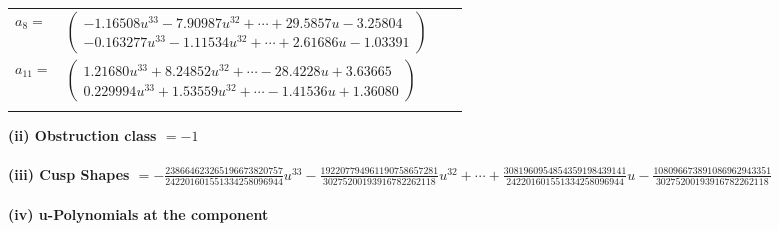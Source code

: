 \documentclass[1p]{elsarticle_modified}
\theoremstyle{definition}
\begin{document}
\begin{tabular}{m{7pt} m{180pt} m{7pt} m{180pt} }
\flushright $a_{8}=$&$\begin{pmatrix}-1.16508 u^{33}-7.90987 u^{32}+\cdots+29.5857 u-3.25804\\-0.163277 u^{33}-1.11534 u^{32}+\cdots+2.61686 u-1.03391\end{pmatrix}$ \\
\flushright $a_{11}=$&$\begin{pmatrix}1.21680 u^{33}+8.24852 u^{32}+\cdots-28.4228 u+3.63665\\0.229994 u^{33}+1.53559 u^{32}+\cdots-1.41536 u+1.36080\end{pmatrix}$\\&\end{tabular}
\flushleft \textbf{(ii) Obstruction class $= -1$}\\~\\
\flushleft \textbf{(iii) Cusp Shapes $= -\frac{238664623265196673820757}{242201601551334258096944} u^{33}-\frac{192207794961190758657281}{30275200193916782262118} u^{32}+\cdots+\frac{3081960954854359198439141}{242201601551334258096944} u-\frac{108096673891086962943351}{30275200193916782262118}$}\\~\\
\newpage\renewcommand{\arraystretch}{1}
\flushleft \textbf{(iv) u-Polynomials at the component}\newline \\
\end{document}
